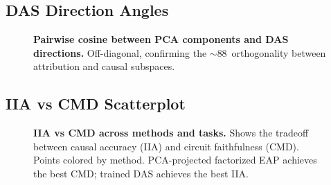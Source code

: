 \documentclass[11pt]{article}
\begin{document}

\subsection{DAS Direction Angles}
\label{fig:das_angles}

\begin{figure}[h!]
\centering
\caption{\textbf{Pairwise cosine between PCA components and DAS
directions.} Off-diagonal, confirming the $\sim$88\textdegree\
orthogonality between attribution and causal subspaces.}
\end{figure}


\subsection{IIA vs CMD Scatterplot}
\label{fig:iia_vs_cmd}

\begin{figure}[h!]
\centering
\caption{\textbf{IIA vs CMD across methods and tasks.} Shows the
tradeoff between causal accuracy (IIA) and circuit faithfulness (CMD).
Points colored by method. PCA-projected factorized EAP achieves the
best CMD; trained DAS achieves the best IIA.}
\end{figure}

\end{document}
